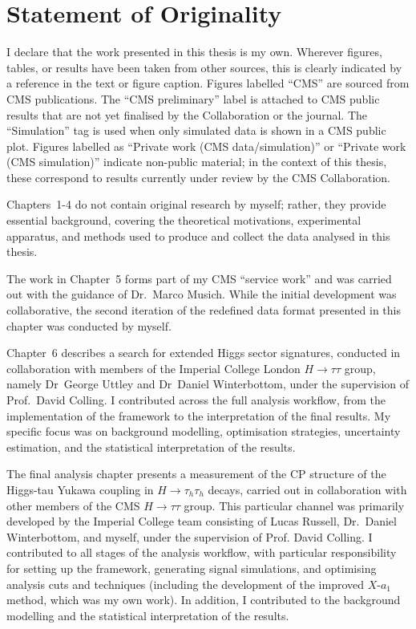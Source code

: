 \documentclass[12pt, a4paper, twoside]{report}
\begin{document}
\chapter*{Statement of Originality}

I declare that the work presented in this thesis is my own. Wherever figures, tables, or results have been taken from other sources, this is clearly indicated by a reference in the text or figure caption. Figures labelled ``CMS'' are sourced from CMS publications. The ``CMS preliminary'' label is attached to CMS public results that are not yet finalised by the Collaboration or the journal. The ``Simulation'' tag is used when only simulated data is shown in a CMS public plot. Figures labelled as ``Private work (CMS data/simulation)'' or ``Private work (CMS simulation)'' indicate non-public material; in the context of this thesis, these correspond to results currently under review by the CMS Collaboration. 

Chapters~1-4 do not contain original research by myself; rather, they provide essential background, covering the theoretical motivations, experimental apparatus, and methods used to produce and collect the data analysed in this thesis.  

The work in Chapter~5 forms part of my CMS ``service work'' and was carried out with the guidance of Dr.~Marco Musich. While the initial development was collaborative, the second iteration of the redefined data format presented in this chapter was conducted by myself.  

Chapter~6 describes a search for extended Higgs sector signatures, conducted in collaboration with members of the Imperial College London $H\to\tau\tau$ group, namely Dr~George Uttley and Dr~Daniel Winterbottom, under the supervision of Prof.~David Colling. I contributed across the full analysis workflow, from the implementation of the framework to the interpretation of the final results. My specific focus was on background modelling, optimisation strategies, uncertainty estimation, and the statistical interpretation of the results.  

The final analysis chapter presents a measurement of the CP structure of the Higgs-tau Yukawa coupling in $H\to\tau_h\tau_h$ decays, carried out in collaboration with other members of the CMS $H\to\tau\tau$ group. This particular channel was primarily developed by the Imperial College team consisting of Lucas Russell, Dr.~Daniel Winterbottom, and myself, under the supervision of Prof. David Colling. I contributed to all stages of the analysis workflow, with particular responsibility for setting up the framework, generating signal simulations, and optimising analysis cuts and techniques (including the development of the improved $X$-$a_1$ method, which was my own work). In addition, I contributed to the background modelling and the statistical interpretation of the results.  
\end{document}
